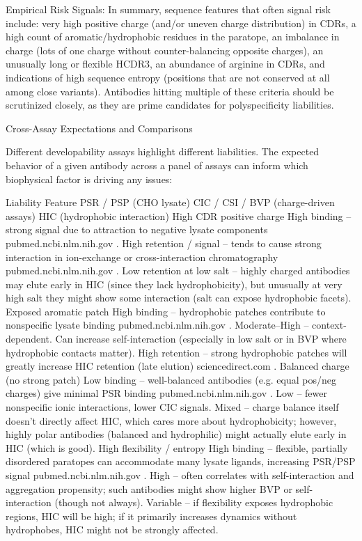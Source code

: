 Empirical Risk Signals: In summary, sequence features that often signal risk include: very high positive charge (and/or uneven charge distribution) in CDRs, a high count of aromatic/hydrophobic residues in the paratope, an imbalance in charge (lots of one charge without counter-balancing opposite charges), an unusually long or flexible HCDR3, an abundance of arginine in CDRs, and indications of high sequence entropy (positions that are not conserved at all among close variants). Antibodies hitting multiple of these criteria should be scrutinized closely, as they are prime candidates for polyspecificity liabilities.

Cross-Assay Expectations and Comparisons

Different developability assays highlight different liabilities. The expected behavior of a given antibody across a panel of assays can inform which biophysical factor is driving any issues:

Liability Feature	PSR / PSP (CHO lysate)	CIC / CSI / BVP (charge-driven assays)	HIC (hydrophobic interaction)
High CDR positive charge	High binding – strong signal due to attraction to negative lysate components
pubmed.ncbi.nlm.nih.gov
.	High retention / signal – tends to cause strong interaction in ion-exchange or cross-interaction chromatography
pubmed.ncbi.nlm.nih.gov
.	Low retention at low salt – highly charged antibodies may elute early in HIC (since they lack hydrophobicity), but unusually at very high salt they might show some interaction (salt can expose hydrophobic facets).
Exposed aromatic patch	High binding – hydrophobic patches contribute to nonspecific lysate binding
pubmed.ncbi.nlm.nih.gov
.	Moderate–High – context-dependent. Can increase self-interaction (especially in low salt or in BVP where hydrophobic contacts matter).	High retention – strong hydrophobic patches will greatly increase HIC retention (late elution)
sciencedirect.com
.
Balanced charge (no strong patch)	Low binding – well-balanced antibodies (e.g. equal pos/neg charges) give minimal PSR binding
pubmed.ncbi.nlm.nih.gov
.	Low – fewer nonspecific ionic interactions, lower CIC signals.	Mixed – charge balance itself doesn’t directly affect HIC, which cares more about hydrophobicity; however, highly polar antibodies (balanced and hydrophilic) might actually elute early in HIC (which is good).
High flexibility / entropy	High binding – flexible, partially disordered paratopes can accommodate many lysate ligands, increasing PSR/PSP signal
pubmed.ncbi.nlm.nih.gov
.	High – often correlates with self-interaction and aggregation propensity; such antibodies might show higher BVP or self-interaction (though not always).	Variable – if flexibility exposes hydrophobic regions, HIC will be high; if it primarily increases dynamics without hydrophobes, HIC might not be strongly affected.

